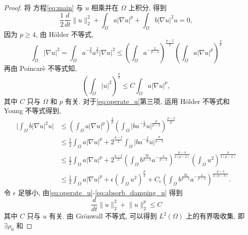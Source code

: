 \documentclass[oneside,longtitle]{LZUthesis}
\numberwithin{equation}{chapter}
\newcommand*\abs[1]{\lvert#1\rvert}
\newcommand*\norm[1]{\lVert#1\rVert}
\begin{document}
\begin{proof}
	将 方程\eqref{eq:main} 与 $u$ 相乘并在 $\Omega$ 上积分,
	得到
	\begin{equation}\label{eq:operate_u}
		\frac{1}{2}\frac{d}{dt}\norm{u}_2^2
		+ \int_\Omega a\abs{\nabla u}^p
		+ \int_\Omega b\abs{\nabla u}^2u = 0,
	\end{equation}
	因为 $p \geq 4$, 由 H\"older 不等式,
	\begin{equation}\label{eq:DL2_bd_W1pa}
		\int_{\Omega}\abs{\nabla u}^2
		= \int_{\Omega}a^{-\frac{2}{p}}a^{\frac{2}{p}}\abs{\nabla u}^2
		\leq \left(\int_{\Omega}a^{-\frac{2}{p-2}}\right)^{\frac{p-2}{p}}
		\left(\int_{\Omega}a\abs{\nabla u}^p\right)^{\frac{2}{p}}
	\end{equation}
	再由 Poincar\`e 不等式知,
	\begin{equation*}
		\left(\int_{\Omega}\abs{u}^2\right)^{\frac{p}{2}}
		\leq C\int_{\Omega}a\abs{\nabla u}^p,
	\end{equation*}
	其中 $C$ 只与 $\Omega$ 和 $p$ 有关. 对于\cref{eq:operate_u}第三项, 运用
	H\"older 不等式和 Young 不等式得到,
	\begin{equation}\label{eq:absorb_damping_u}
		\begin{split}
			\abs{\int_{\Omega}b\abs{\nabla u}^2 u}
			&\leq \left(\int_{\Omega}a\abs{\nabla u}^p\right)^{\frac{2}{p}}
			\left(\int_{\Omega}\abs{b a^{-\frac{2}{p}} u}^{\frac{p}{p-2}}\right)^{\frac{p-2}{p}}\\
			&\leq \frac{1}{2}\int_{\Omega}a\abs{\nabla u}^p
			+ 2^{\frac{p-2}{2}}\int_{\Omega}\abs{b a^{-\frac{2}{p}} u}^{\frac{p}{p-2}}\\
			&\leq \frac{1}{2}\int_{\Omega}a\abs{\nabla u}^p
			+ 2^{\frac{p-2}{2}}\left(\int_{\Omega}b^{\frac{2p}{p-4}}a^{-\frac{4}{p-4}}\right)^{\frac{p-4}{2(p-2)}}
			\left(\int_{\Omega}u^2\right)^{\frac{p}{2(p-2)}}\\
			&\leq \frac{1}{2}\int_{\Omega}a\abs{\nabla u}^p
			+ \epsilon \left(\int_{\Omega}u^2\right)^{\frac{p}{2}}
			+ C_{\epsilon}\left(\int_{\Omega}b^{\frac{2p}{p-4}}a^{-\frac{4}{p-4}}\right)^{\frac{p-4}{2(p-3)}}.
		\end{split}
	\end{equation}
	令 $\epsilon$ 足够小, 由\cref{eq:operate_u}-\cref{eq:absorb_damping_u} 得到
	\begin{equation}\label{eq:DL2_L2_bd}
		\frac{d}{dt}\norm{u}_2^2 + \norm{u}_2^p \leq C
	\end{equation}
	其中 $C$ 只与 $u$ 有关. 由 Gr\"onwall 不等式, 可以得到 $L^2(\Omega)$ 上的有界吸收集,
	即 $\exists \rho_0$ 和

\end{proof}
\end{document}
